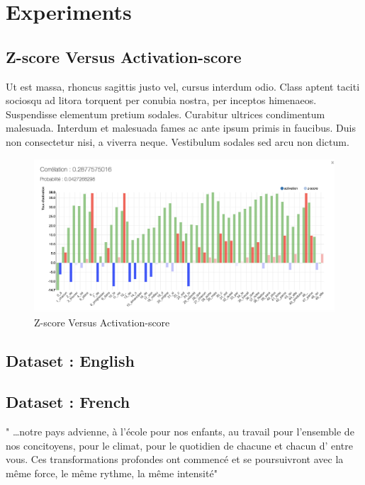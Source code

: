 \section{Experiments}

\subsection{Z-score Versus Activation-score}

Ut est massa, rhoncus sagittis justo vel, cursus interdum odio. Class aptent taciti sociosqu ad litora torquent per conubia nostra, per inceptos himenaeos. Suspendisse elementum pretium sodales. Curabitur ultrices condimentum malesuada. Interdum et malesuada fames ac ante ipsum primis in faucibus. Duis non consectetur nisi, a viverra neque. Vestibulum sodales sed arcu non dictum.

\begin{figure}[h]
\begin{center}
\includegraphics[width=16cm]{img/comaprison.png}
\caption{Z-score Versus Activation-score}
\label{comparision}
\end{center}
\end{figure}

\subsection{Dataset : English}


\subsection{Dataset : French}

" …notre pays advienne, à l'école pour nos enfants, au travail pour l'ensemble de nos concitoyens, pour le climat, pour le quotidien de chacune et chacun d' entre vous. Ces transformations profondes ont commencé et se poursuivront avec la même force, le même rythme, la même intensité"


